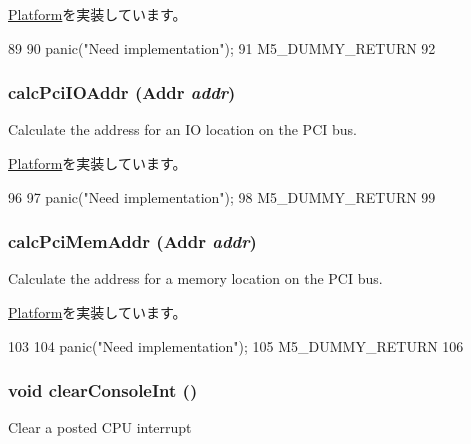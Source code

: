 \hyperlink{classPlatform_a4a2bdce1a8794dd3ea6ca12b36320433}{Platform}を実装しています。


\begin{DoxyCode}
89 {
90     panic("Need implementation\n");
91     M5_DUMMY_RETURN
92 }
\end{DoxyCode}
\hypertarget{classT1000_a83afd16479598cfaeb035fd30eeedd8b}{
\subsubsection[{calcPciIOAddr}]{ calcPciIOAddr ({\bf Addr} {\em addr})}}
\label{classT1000_a83afd16479598cfaeb035fd30eeedd8b}
Calculate the address for an IO location on the PCI bus. 

\hyperlink{classPlatform_a3d1d55996e865ab1b65c732496c08b00}{Platform}を実装しています。


\begin{DoxyCode}
96 {
97     panic("Need implementation\n");
98     M5_DUMMY_RETURN
99 }
\end{DoxyCode}
\hypertarget{classT1000_aa2acd9bf04ba56b380e7812ce29971b5}{
\subsubsection[{calcPciMemAddr}]{ calcPciMemAddr ({\bf Addr} {\em addr})}}
\label{classT1000_aa2acd9bf04ba56b380e7812ce29971b5}
Calculate the address for a memory location on the PCI bus. 

\hyperlink{classPlatform_a303d8161e77b31b8425cb320562a54b2}{Platform}を実装しています。


\begin{DoxyCode}
103 {
104     panic("Need implementation\n");
105     M5_DUMMY_RETURN
106 }
\end{DoxyCode}
\hypertarget{classT1000_ad38e46034c079c8e765d3ac7eb99337d}{
\subsubsection[{clearConsoleInt}]{\setlength{\rightskip}{0pt plus 5cm}void clearConsoleInt ()}}
\label{classT1000_ad38e46034c079c8e765d3ac7eb99337d}
Clear a posted CPU interrupt 

